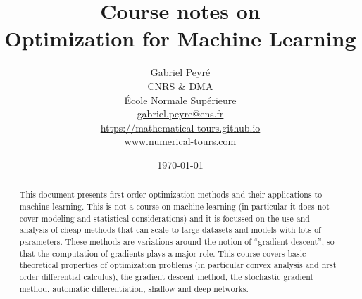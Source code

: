 \documentclass[10pt]{article}
\title{Course notes on\\Optimization for Machine Learning}
\author{%
\begin{tabular}{c}
	Gabriel Peyr{\'e} \\ CNRS \& DMA \\
	 \'Ecole Normale Sup\'erieure \\
	 \url{gabriel.peyre@ens.fr}\\
	 \url{https://mathematical-tours.github.io}\\
	 \url{www.numerical-tours.com}
\end{tabular}
}
\date{\today}
\begin{document}
\maketitle

\begin{abstract}
		This document presents first order optimization methods and their applications to machine learning. 
		This is not a course on machine learning (in particular it does not cover modeling and statistical considerations) and it is focussed on the use and analysis of cheap methods that can scale to large datasets and models with lots of parameters. These methods are variations around the notion of ``gradient descent'', so that the computation of gradients plays a major role.
		This course covers basic theoretical properties of optimization problems (in particular convex analysis and first order differential calculus), the gradient descent method, the stochastic gradient method, automatic differentiation, shallow and deep networks.  
\end{abstract}

\tableofcontents

 

%
%
%
%



% 






\end{document}
